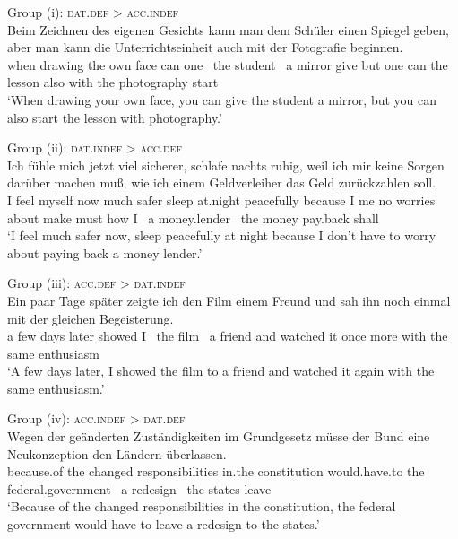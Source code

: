 \documentclass[output=paper,colorlinks,citecolor=brown]{langscibook}
\begin{document}
\newpage
\ea\label{ex:sample.dat.def.acc.indef}
    Group (i): \textsc{dat.def} > \textsc{acc.indef}\\
    \gll Beim Zeichnen des eigenen Gesichts kann man \up{[}dem Schüler\up{]\sub{\textsc{dat}, def}} \up{[}einen Spiegel\up{]\sub{\textsc{acc}, indef}} geben, aber man kann die Unterrichtseinheit auch mit der Fotografie beginnen. \\ 
    when drawing the own face can one {\ the} student {\ a} mirror give but one can the lesson also with the photography start \\
    \glt `When drawing your own face, you can give the student a mirror, but you can also start the lesson with photography.'
    \z

\ea\label{ex:sample.dat.indef.acc.def}
   Group (ii): \textsc{dat.indef} > \textsc{acc.def}\\
   \gll Ich fühle mich jetzt viel sicherer, schlafe nachts ruhig, weil ich mir keine Sorgen darüber machen muß, wie ich \up{[}einem Geldverleiher\up{]\sub{\textsc{dat}, indef}} \up{[}das Geld\up{]\sub{\textsc{acc}, def}} zurückzahlen soll.\\
   I feel myself now much safer sleep at.night peacefully because I me no worries about make must how I {\ a} money.lender {\ the} money pay.back shall\\
    \glt `I feel much safer now, sleep peacefully at night because I don't have to worry about paying back a money lender.'
    \z 
    
\ea\label{ex:sample.acc.def.dat.indef}
    Group (iii): \textsc{acc.def} > \textsc{dat.indef}\\
    \gll Ein paar Tage später zeigte ich \up{[}den Film\up{]\sub{\textsc{acc}, def}} \up{[}einem Freund\up{]\sub{\textsc{dat}, indef}} und sah ihn noch einmal mit der gleichen Begeisterung.\\
    a few days later showed I {\ the} film {\ a} friend and watched it once more with the same enthusiasm\\
    \glt `A few days later, I showed the film to a friend and watched it again with the same enthusiasm.'
    \z
    
\ea\label{ex:sample.acc.indef.dat.def}
    Group (iv): \textsc{acc.indef} > \textsc{dat.def}\\
    \gll Wegen der geänderten Zuständigkeiten im Grundgesetz müsse der Bund \up{[}eine Neukonzeption\up{]\sub{\textsc{acc}, indef}} \up{[}den Ländern\up{]\sub{\textsc{dat}, def}} überlassen. \\ %
   because.of the changed  responsibilities in.the constitution would.have.to the federal.government {\ a} redesign {\ the} states leave  \\
    \glt `Because of the changed responsibilities in the constitution, the federal government would have to leave a redesign to the states.'
    \z
\end{document}
